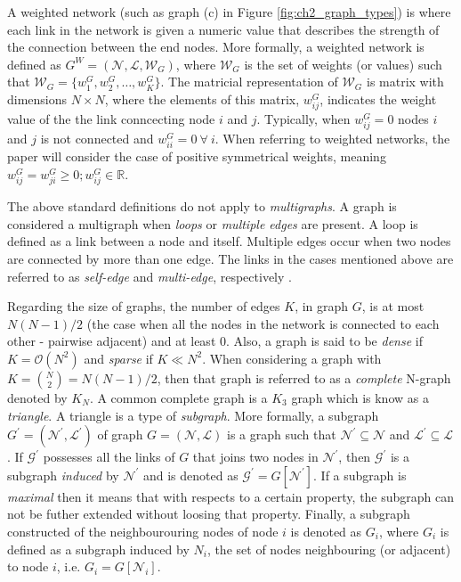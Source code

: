 A weighted network (such as graph (c) in Figure \ref{fig:ch2_graph_types}) is where each link in the network is given a numeric value that describes the strength of the connection between the end nodes. More formally, a weighted network is defined as $G^W = (\mathcal{N},\mathcal{L},\mathcal{W}_G)$, where $\mathcal{W}_G$ is the set of weights (or values) such that $\mathcal{W}_G = \{w^G_1,w^G_2,\ldots,w^G_K\}$. The matricial representation of $\mathcal{W}_G$ is matrix with dimensions $N \times N$, where the elements of this matrix, $w^G_{ij}$, indicates the weight value of the the link conncecting node $i$ and $j$. Typically, when $w^G_{ij} = 0$ nodes $i$ and $j$ is not connected and $w^G_{ii} = 0\: \forall \:i$. When referring to weighted networks, the paper will consider the case of positive symmetrical weights, meaning $w^G_{ij} = w^G_{ji} \geq 0; w^G_{ij} \in \mathbb{R}$.

The above standard definitions do not apply to \textit{multigraphs}. A graph is considered a  multigraph when \textit{loops} or \textit{multiple edges} are present. A loop is defined as a link between a node and itself. Multiple edges occur when two nodes are connected by more than one edge. The links in the cases mentioned above are referred to as \textit{self-edge} and \textit{multi-edge}, respectively \citep*{baesens2015fraud}.    

Regarding the size of graphs, the number of edges $K$, in graph $G$, is at most $N(N-1)/2$ (the case when all the nodes in the network is connected to each other - pairwise adjacent) and at least $0$. Also, a graph is said to be \textit{dense} if $K = \mathcal{O}(N^2)$ and \textit{sparse} if $K \ll N^2$. When considering a graph with  $K = \binom{N}{2} = N(N-1)/2$, then that graph is referred to as a \textit{complete} N-graph denoted by $K_N$. A common complete graph is a $K_3$ graph which is know as a \textit{triangle}. A triangle is a type of \textit{subgraph}. More formally, a subgraph $G^\prime = (\mathcal{N^\prime},\mathcal{L^\prime})$ of graph $G = (\mathcal{N},\mathcal{L})$ is a graph such that $\mathcal{N^\prime} \subseteq \mathcal{N}$ and $\mathcal{L^\prime} \subseteq \mathcal{L}$. If $\mathcal{G^\prime}$ possesses all the links of $G$ that joins two nodes in $\mathcal{N^\prime}$, then $\mathcal{G^\prime}$ is a subgraph \textit{induced} by $\mathcal{N^\prime}$ and is denoted as $\mathcal{G^\prime} = G[\mathcal{N^\prime}]$. If a subgraph is \textit{maximal} then it means that with respects to a certain property, the subgraph can not be futher extended without loosing that property. Finally, a subgraph constructed of the neighbourouring nodes of node $i$ is denoted as $G_i$, where $G_i$ is defined as a subgraph induced by $N_i$, the set of nodes neighbouring (or adjacent) to node $i$, i.e. $G_i = G[\mathcal{N}_i]$.

